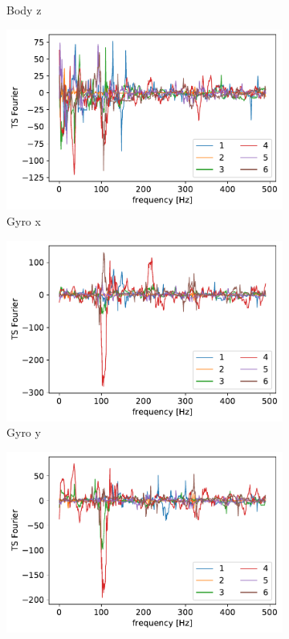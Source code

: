 \documentclass[10pt, a4paper, twocolumn]{article}
\begin{document}
\begin{figure}
\begin{subfigure}[t]{0.3\columnwidth}
    \caption{Body z}
    \label{fig:bzclu}
    \end{subfigure}
    
    
    \begin{subfigure}[t]{0.3\columnwidth}
    \includegraphics[width=\linewidth]{cluster_gyro_x.pdf}
    \caption{Gyro x}
    \label{fig:gxclu}
    \end{subfigure}
    \hfill%
    \begin{subfigure}[t]{0.3\columnwidth}
    \includegraphics[width=\linewidth]{cluster_gyro_y.pdf}
    \caption{Gyro y}
    \label{fig:gyclu}
    \end{subfigure}
    \hfill%
    \begin{subfigure}[t]{0.3\columnwidth}
    \includegraphics[width=\linewidth]{cluster_gyro_z.pdf}

\end{subfigure}
\end{figure}
\end{document}
